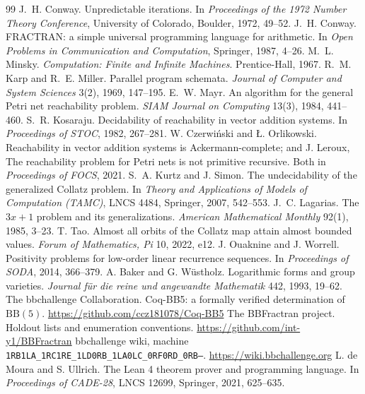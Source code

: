 \documentclass[11pt,a4paper]{article}
\theoremstyle{plain}
\theoremstyle{definition}
\begin{document}
\begin{thebibliography}{99}
 J.~H. Conway. Unpredictable iterations. In
\textit{Proceedings of the 1972 Number Theory Conference}, University of
Colorado, Boulder, 1972, 49--52.
 J.~H. Conway. FRACTRAN: a simple universal
programming language for arithmetic. In \textit{Open Problems in
Communication and Computation}, Springer, 1987, 4--26.
 M.~L. Minsky. \textit{Computation: Finite and
Infinite Machines}. Prentice-Hall, 1967.
 R.~M. Karp and R.~E. Miller. Parallel program
schemata. \textit{Journal of Computer and System Sciences} 3(2), 1969,
147--195.
 E.~W. Mayr. An algorithm for the general Petri net
reachability problem. \textit{SIAM Journal on Computing} 13(3), 1984,
441--460.
 S.~R. Kosaraju. Decidability of reachability in vector
addition systems. In \textit{Proceedings of STOC}, 1982, 267--281.
 W. Czerwi\'nski and \L. Orlikowski. Reachability in vector
addition systems is Ackermann-complete; and J. Leroux, The reachability
problem for Petri nets is not primitive recursive. Both in
\textit{Proceedings of FOCS}, 2021.
 S.~A. Kurtz and J. Simon. The undecidability of the
generalized Collatz problem. In \textit{Theory and Applications of Models
of Computation (TAMC)}, LNCS 4484, Springer, 2007, 542--553.
 J.~C. Lagarias. The $3x+1$ problem and its
generalizations. \textit{American Mathematical Monthly} 92(1), 1985,
3--23.
 T. Tao. Almost all orbits of the Collatz map attain almost
bounded values. \textit{Forum of Mathematics, Pi} 10, 2022, e12.
 J. Ouaknine and J. Worrell. Positivity problems
for low-order linear recurrence sequences. In \textit{Proceedings of
SODA}, 2014, 366--379.
 A. Baker and G. W\"ustholz. Logarithmic forms and
group varieties. \textit{Journal f\"ur die reine und angewandte
Mathematik} 442, 1993, 19--62.
 The bbchallenge Collaboration. Coq-BB5: a formally
verified determination of $\mathrm{BB}(5)$.
\url{https://github.com/ccz181078/Coq-BB5}
 The BBFractran project. Holdout lists and
enumeration conventions. \url{https://github.com/int-y1/BBFractran}
 bbchallenge wiki, machine
\texttt{1RB1LA\_1RC1RE\_1LD0RB\_1LA0LC\_0RF0RD\_0RB---}.
\url{https://wiki.bbchallenge.org}
 L. de Moura and S. Ullrich. The Lean 4 theorem prover and
programming language. In \textit{Proceedings of CADE-28}, LNCS 12699,
Springer, 2021, 625--635.
\end{thebibliography}
\end{document}
